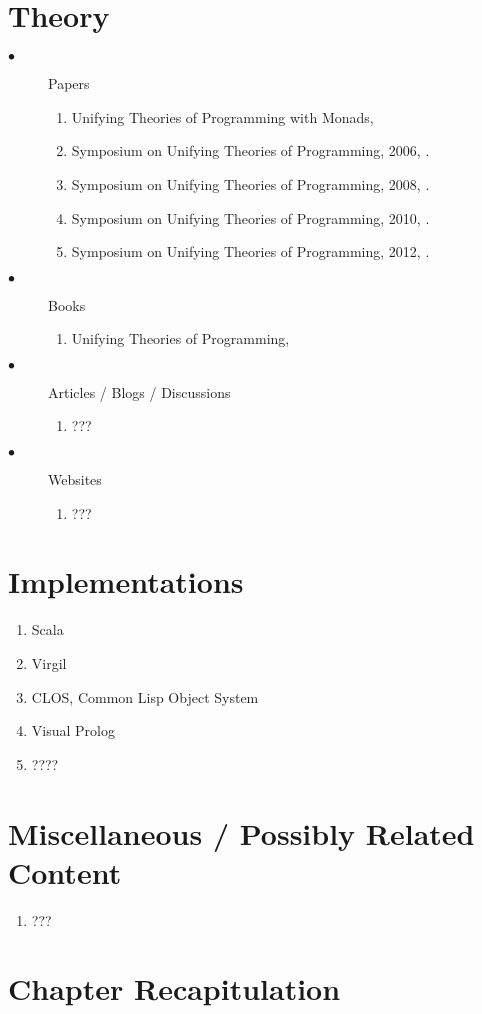 \documentclass[thesis-solanki.tex]{subfiles}
\begin{document}
\section{Theory}
\begin{description}

\item[$\bullet$] Papers
\begin{enumerate}
\item Unifying Theories of Programming with Monads, \cite{gibbons2013unifying}

\item Symposium on Unifying Theories of Programming, 2006, \cite{DBLP:conf/utp/2006}.

\item Symposium on Unifying Theories of Programming, 2008, \cite{DBLP:conf/utp/2008}.

\item Symposium on Unifying Theories of Programming, 2010, \cite{DBLP:conf/utp/2010}.

\item Symposium on Unifying Theories of Programming, 2012, \cite{DBLP:conf/utp/2012}.

\end{enumerate}

\item[$\bullet$] Books
\begin{enumerate}
\item Unifying Theories of Programming, \cite{hoare1998unifying}
\end{enumerate}

\item[$\bullet$] Articles / Blogs / Discussions
\begin{enumerate}
\item ???
\end{enumerate}

\item[$\bullet$] Websites
\begin{enumerate}
\item ???
\end{enumerate}

\end{description}


\section{Implementations}
\begin{enumerate}
\item Scala
\item Virgil
\item CLOS, Common Lisp Object System
\item Visual Prolog
\item ????
\end{enumerate}

\section{Miscellaneous / Possibly Related Content}
\begin{enumerate}
\item ???
\end{enumerate}



\section{Chapter Recapitulation}
\end{document}

